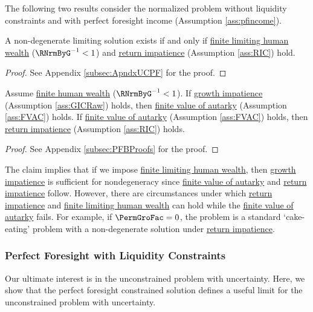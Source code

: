 \documentclass[BufferStockTheory]{subfiles}
\begin{document}
The following two results consider the normalized problem without liquidity constraints and with perfect foresight income (Assumption \ref{ass:pfincome}).

\begin{proposition}\label{prop:pfUCFHWC}
 A non-degenerate limiting solution exists if and only if \hyperlink{FHWC}{finite limiting  human wealth} ($\RNrmByG^{-1}<1$) and \hyperlink{RIC}{return impatience} (Assumption \ref{ass:RIC}) hold. 
\end{proposition}
\begin{proof}\let\qed\relax
  See Appendix \ref{subsec:ApndxUCPF} for the proof.

\end{proof}
  

\begin{claim}\label{claim:PFConspC}
Assume \hyperlink{FHWC}{finite human wealth} ($\RNrmByG^{-1}<1$). If \hyperlink{GIC}{growth impatience} (Assumption \ref{ass:GICRaw}) holds, then \hyperlink{FVAC}{finite value of autarky} (Assumption \ref{ass:FVAC}) holds. If \hyperlink{FVAC}{finite value of autarky} (Assumption \ref{ass:FVAC}) holds, then \hyperlink{RIC}{return impatience} (Assumption \ref{ass:RIC}) holds. 
\end{claim}
\begin{proof}\let\qed\relax
See Appendix \ref{subsec:PFBProofs} for the proof.
\end{proof}

The claim implies that if we impose \hyperlink{FHWC}{finite limiting  human wealth}, then  \hyperlink{GIC}{growth impatience} is sufficient for nondegeneracy since \hyperlink{FVAC}{finite value of autarky} and \hyperlink{RIC}{return impatience} follow.
However, there are circumstances under which \hyperlink{RIC}{return impatience} and \hyperlink{FHWC}{finite limiting  human wealth} can hold while the \hyperlink{FVAC}{finite value of autarky} fails.
For example, if $\PermGroFac=0$, the problem is a standard `cake-eating' problem with a non-degenerate solution under \hyperlink{RIC}{return impatience}.



\subsubsection{Perfect Foresight with Liquidity Constraints}

Our ultimate interest is in the unconstrained problem with uncertainty.
Here, we show that the perfect foresight constrained solution defines a useful limit for the unconstrained problem with uncertainty.
\end{document}
